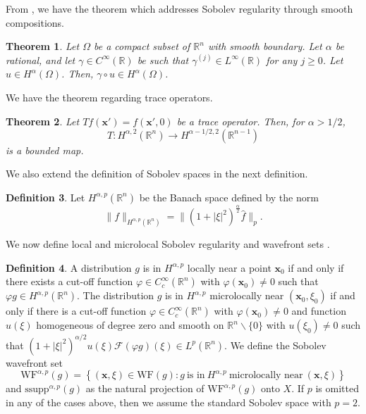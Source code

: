 \documentclass[a4paper,12pt]{amsart}
\numberwithin{equation}{section}
\theoremstyle{plain}
\newtheorem{theorem}{Theorem}
\numberwithin{theorem}{section}
\theoremstyle{definition}
\newtheorem{definition}[theorem]{Definition}
\theoremstyle{remark}
\theoremstyle{remark}
\theoremstyle{remark}
\newcommand{\WF}{\mathrm{WF}}                         %
\newcommand{\vx}{{\mathbf{x}}}
\newcommand{\seanc}[1]{\begin{quotation}\textbf{Sean's comment:\
}{\textit{#1}}\end{quotation}}
\begin{document}
From \cite{sobolev}, we have the theorem which addresses Sobolev regularity through smooth compositions.

\begin{theorem}
\label{sobo}
Let $\Omega$ be a compact subset of $\mathbb{R}^n$ with smooth boundary. Let $\alpha$ be rational, and let $\gamma \in C^{\infty}(\mathbb{R})$ be such that $\gamma^{(j)}\in L^{\infty}(\mathbb{R})$ for any $j\geq 0$. Let $u \in H^{\alpha}(\Omega)$. Then, $\gamma \circ u \in H^{\alpha}(\Omega)$. 
\end{theorem}

\noindent We have the theorem regarding trace operators.
\begin{theorem}
\label{trace_thm}
Let $Tf(\vx') = f(\vx',0)$ be a trace operator. Then, for $\alpha > 1/2$,
\begin{equation}
T: H^{\alpha,2}(\mathbb{R}^n) \to H^{\alpha-1/2,2}(\mathbb{R}^{n-1})
\end{equation}
is a bounded map.
\end{theorem}

\noindent We also extend the definition of Sobolev spaces in the next definition.

\begin{definition}\label{gen_sobo}
    Let $H^{\alpha,p}(\mathbb{R}^n)$ be the Banach space defined by the norm
    \[
    \|f\|_{H^{\alpha,p}(\mathbb{R}^n)} = \| (1+|\xi|^2)^{\frac{\alpha}{2}} \hat{f}\|_p.
    \]
\end{definition}

\noindent We now define local and microlocal Sobolev regularity and wavefront sets \cite{Q1993sing}.

\begin{definition} \label{def:SobolevWF}
A distribution $g$ is in $H^{\alpha,p}$ locally near a point $\vx_0$ if and only if there exists a cut-off function $\varphi \in C_c^{\infty}(\mathbb{R}^n)$ with $\varphi(\vx_0) \neq 0$ such that $\varphi g \in H^{\alpha,p}(\mathbb{R}^n)$. The distribution $g$ is in $H^{\alpha,p}$ microlocally near $(\vx_0,\xi_0)$ if and only if there is a cut-off function $\varphi \in C^{\infty}_c(\mathbb{R}^n)$ with $\varphi(\vx_0) \neq 0$ and function $u(\xi)$ homogeneous of degree zero and smooth on $\mathbb{R}^n\backslash \{0\}$ with $u(\xi_0)\neq 0$ such that $(1+|\xi|^2)^{\alpha/2}u(\xi)\mathcal{F}(\varphi g)(\xi) \in L^p(\mathbb{R}^n)$. We define the Sobolev wavefront set
\begin{equation}
\WF^{\alpha,p}(g) = \left\{ (\vx,\xi) \in \WF(g) : g\ \text{is in}\ H^{\alpha,p}\ \text{microlocally near}\ (\vx, \xi) \right\}
\end{equation}
and $\text{ssupp}^{\alpha,p}(g)$ as the natural projection of $\WF^{\alpha,p}(g)$ onto $X$. If $p$ is omitted in any of the cases above, then we assume the standard Sobolev space with $p = 2$.
\end{definition}
\end{document}
